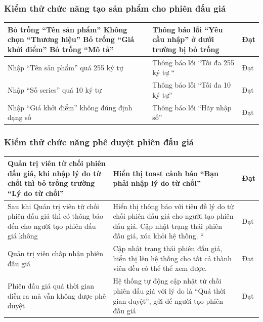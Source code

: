 \documentclass{article}
\begin{document}
\subsubsection{Kiểm thử chức năng tạo sản phẩm cho phiên đấu giá}
    \tabletail{\hline}
    \label{bang414}
    \begin{supertabular}{| p{.45\textwidth}|p{.30\textwidth}|p{.15\textwidth}|} 
    \hline
        Bỏ trống “Tên sản phẩm”
        Không chọn “Thương hiệu”
        Bỏ trống “Giá khởi điểm”
        Bỏ trống “Mô tả”
        & Thông báo lỗi “Yêu cầu nhập” ở dưới trường bị bỏ trống&Đạt \\\hline
        Nhập “Tên sản phẩm” quá 255 ký tự
        & Thông báo lỗi “Tối đa 255 ký tự “&Đạt \\\hline
        Nhập “Số series” quá 10 ký tự
        & Thông báo lỗi “Tối đa 10 ký tự”&Đạt \\\hline
        Nhập “Giá khởi điểm” không đúng định dạng số
        & Thông báo lỗi “Hãy nhập số”&Đạt \\\hline
    \end{supertabular}
\subsubsection{Kiểm thử chức năng phê duyệt phiên đấu giá}
    \tabletail{\hline}
    \label{bang415}
    \begin{supertabular}{| p{.45\textwidth}|p{.30\textwidth}|p{.15\textwidth}|} 
    \hline
        Quản trị viên từ chối phiên đấu giá, khi nhập lý do từ chối thì bỏ trống trường “Lý do từ chối”
        & Hiển thị toast cảnh báo “Bạn phải nhập lý do từ chối”&Đạt \\\hline
        Sau khi Quản trị viên từ chối phiên đấu giá thì có thông báo đến cho người tạo phiên đấu giá không
        & Hiển thị thông báo với tiêu đề lý do từ chối phiên đấu giá cho người tạo phiên đấu giá. Cập nhật trạng thái phiên đấu giá, xóa khỏi hệ thống. “&Đạt \\\hline
        Quản trị viên chấp nhận phiên đấu giá
        & Cập nhật trạng thái phiên đấu giá, hiển thị lên hệ thống cho tất cả thành viên đều có thể thể xem được. &Đạt \\\hline
        Phiên đấu giá quá thời gian diễn ra mà vẫn không được phê duyệt
        & Hệ thống tự động cập nhật từ chối phiên đấu giá với lý do là “Quá thời gian duyệt”, gửi để người tạo phiên đấu giá&Đạt \\\hline
    \end{supertabular}
\end{document}

